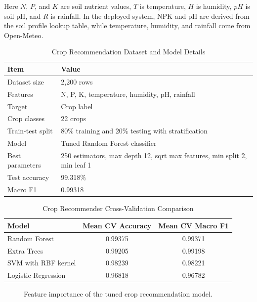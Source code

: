 \documentclass[12pt,a4paper]{report}
\begin{document}
Here $N$, $P$, and $K$ are soil nutrient values, $T$ is temperature, $H$ is humidity, $pH$ is soil pH, and $R$ is rainfall. In the deployed system, NPK and pH are derived from the soil profile lookup table, while temperature, humidity, and rainfall come from Open-Meteo.

\begin{table}[H]
\centering
\caption{Crop Recommendation Dataset and Model Details}
\label{tab:croprec}
\begin{tabular}{p{5cm}p{8.5cm}}
\toprule
\textbf{Item} & \textbf{Value} \\
\midrule
Dataset size & 2,200 rows \\
Features & N, P, K, temperature, humidity, pH, rainfall \\
Target & Crop label \\
Crop classes & 22 crops \\
Train-test split & 80\% training and 20\% testing with stratification \\
Model & Tuned Random Forest classifier \\
Best parameters & 250 estimators, max depth 12, sqrt max features, min split 2, min leaf 1 \\
Test accuracy & 99.318\% \\
Macro F1 & 0.99318 \\
\bottomrule
\end{tabular}
\end{table}

\begin{table}[H]
\centering
\caption{Crop Recommender Cross-Validation Comparison}
\label{tab:crop_models}
\begin{tabular}{lcc}
\toprule
\textbf{Model} & \textbf{Mean CV Accuracy} & \textbf{Mean CV Macro F1} \\
\midrule
Random Forest & 0.99375 & 0.99371 \\
Extra Trees & 0.99205 & 0.99198 \\
SVM with RBF kernel & 0.98239 & 0.98221 \\
Logistic Regression & 0.96818 & 0.96782 \\
\bottomrule
\end{tabular}
\end{table}

\begin{figure}[H]
\centering
{}
\caption{Feature importance of the tuned crop recommendation model.}
\label{fig:crop_importance}
\end{figure}
\end{document}
